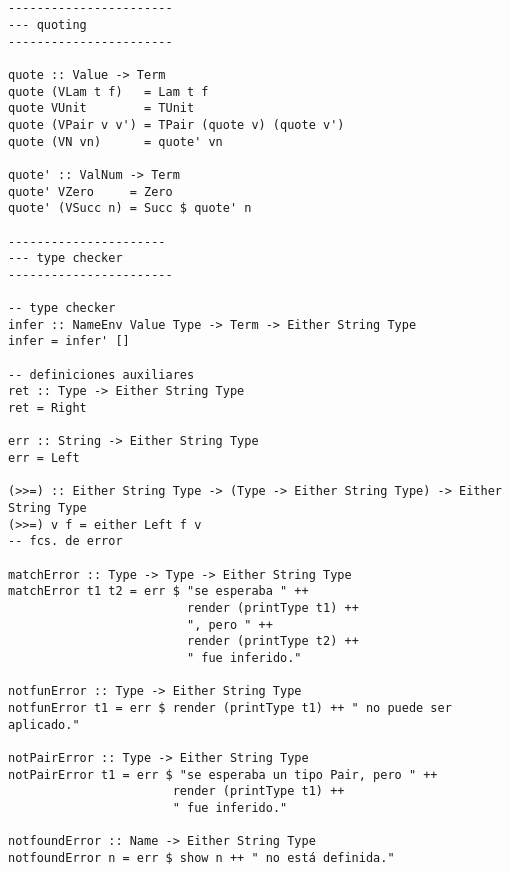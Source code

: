 \documentclass[a4paper]{report}
\begin{document}
\pagebreak
\begin{lstlisting}


-----------------------
--- quoting
-----------------------

quote :: Value -> Term
quote (VLam t f)   = Lam t f
quote VUnit        = TUnit
quote (VPair v v') = TPair (quote v) (quote v')
quote (VN vn)      = quote' vn

quote' :: ValNum -> Term
quote' VZero     = Zero
quote' (VSucc n) = Succ $ quote' n

----------------------
--- type checker
-----------------------

-- type checker
infer :: NameEnv Value Type -> Term -> Either String Type
infer = infer' []

-- definiciones auxiliares
ret :: Type -> Either String Type
ret = Right

err :: String -> Either String Type
err = Left

(>>=) :: Either String Type -> (Type -> Either String Type) -> Either String Type
(>>=) v f = either Left f v
-- fcs. de error

matchError :: Type -> Type -> Either String Type
matchError t1 t2 = err $ "se esperaba " ++
                         render (printType t1) ++
                         ", pero " ++
                         render (printType t2) ++
                         " fue inferido."

notfunError :: Type -> Either String Type
notfunError t1 = err $ render (printType t1) ++ " no puede ser aplicado."

notPairError :: Type -> Either String Type
notPairError t1 = err $ "se esperaba un tipo Pair, pero " ++
                       render (printType t1) ++
                       " fue inferido."

notfoundError :: Name -> Either String Type
notfoundError n = err $ show n ++ " no está definida."

\end{lstlisting}
\pagebreak
\end{document}
